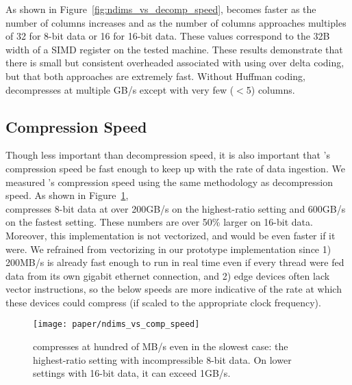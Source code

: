 As shown in Figure~\ref{fig:ndims_vs_decomp_speed}, \minesp becomes faster as the number of columns increases and as the number of columns approaches multiples of 32 for 8-bit data or 16 for 16-bit data. These values correspond to the 32B width of a SIMD register on the tested machine. These results demonstrate that there is small but consistent overheaded associated with using \fire over delta coding, but that both approaches are extremely fast. Without Huffman coding, \minesp decompresses at multiple GB/s except with very few ($<$5) columns.

\subsection{Compression Speed} \label{sec:comp_speed}

Though less important than decompression speed, it is also important that \mine's compression speed be fast enough to keep up with the rate of data ingestion. We measured \mine's compression speed using the same methodology as decompression speed. As shown in Figure~\ref{fig:ndims_vs_comp_speed}, \minesp \\ compresses 8-bit data at over 200GB/s on the highest-ratio setting and 600GB/s on the fastest setting. These numbers are over 50\% larger on 16-bit data. Moreover, this implementation is not vectorized, and would be even faster if it were. We refrained from vectorizing in our prototype implementation since 1) 200MB/s is already fast enough to run in real time even if every thread were fed data from its own gigabit ethernet connection, and 2) edge devices often lack vector instructions, so the below speeds are more indicative of the rate at which these devices could compress (if scaled to the appropriate clock frequency).

\begin{figure}[h]
\begin{center}
    \texttt{[image: paper/ndims\_vs\_comp\_speed]}
    \caption{\minesp compresses at hundred of MB/s even in the slowest case: the highest-ratio setting with incompressible 8-bit data. On lower settings with 16-bit data, it can exceed 1GB/s.}
    \label{fig:ndims_vs_comp_speed}
\end{center}
\end{figure}


